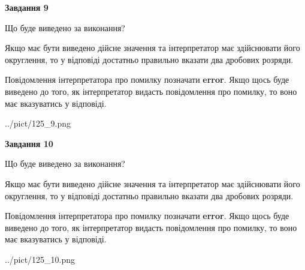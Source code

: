 \documentclass[12pt, ukrainian]{article}
\begin{document}
{\begin {Large}
{\begin {center}\textbf{Завдання 9}\end {center}}\par
Що буде виведено за виконання? \par

Якщо має бути виведено дійсне значення та інтерпретатор має здійснювати його округлення, 
то у відповіді достатньо правильно вказати два дробових розряди.

Повідомлення інтерпретатора про помилку позначати \textbf{error}.
Якщо щось буде виведено до того, як інтерпретатор видасть повідомлення про помилку, 
то воно має вказуватись у відповіді. \par

\begin{center}
	{../pict/125_9.png}
\end{center}
\newpage

{\begin {center}\textbf{Завдання 10}\end {center}}\par
Що буде виведено за виконання? \par

Якщо має бути виведено дійсне значення та інтерпретатор має здійснювати його округлення, 
то у відповіді достатньо правильно вказати два дробових розряди.

Повідомлення інтерпретатора про помилку позначати \textbf{error}.
Якщо щось буде виведено до того, як інтерпретатор видасть повідомлення про помилку, 
то воно має вказуватись у відповіді. \par

\begin{center}
	{../pict/125_10.png}
\end{center}
\newpage

\end {Large}}
\end{document}
